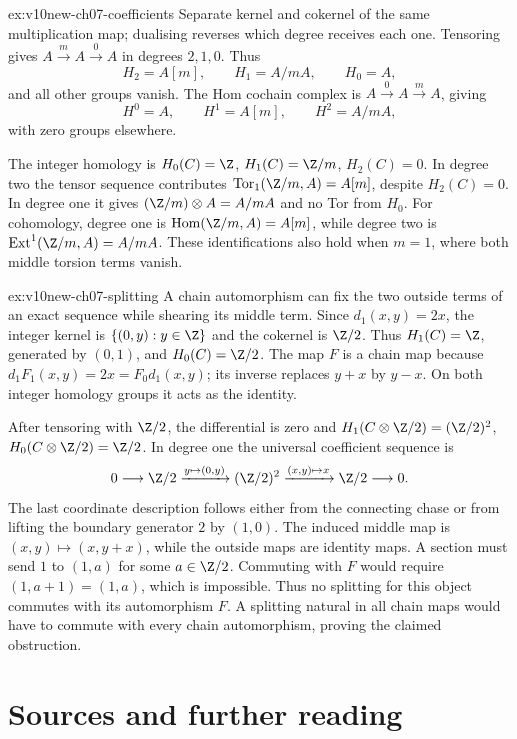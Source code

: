 \begin{solution}{ex:v10new-ch07-coefficients}
\idea Separate kernel and cokernel of the same multiplication map; dualising reverses which degree receives each one.
\writeup Tensoring gives $A\xrightarrow{m}A\xrightarrow0A$ in degrees $2,1,0$. Thus
\[
H_2=A[m],\qquad H_1=A/mA,\qquad H_0=A,
\]
and all other groups vanish. The Hom cochain complex is
$A\xrightarrow0A\xrightarrow{m}A$, giving
\[
H^0=A,\qquad H^1=A[m],\qquad H^2=A/mA,
\]
with zero groups elsewhere.

The integer homology is $H_0(C)=\Z$, $H_1(C)=\Z/m$, $H_2(C)=0$. In degree two the tensor sequence contributes
$\operatorname{Tor}_1(\Z/m,A)=A[m]$, despite $H_2(C)=0$. In degree one it gives $(\Z/m)\otimes A=A/mA$ and no Tor from $H_0$. For cohomology, degree one is
$\operatorname{Hom}(\Z/m,A)=A[m]$, while degree two is
$\operatorname{Ext}^1(\Z/m,A)=A/mA$. These identifications also hold when $m=1$, where both middle torsion terms vanish.
\end{solution}

\begin{solution}{ex:v10new-ch07-splitting}
\idea A chain automorphism can fix the two outside terms of an exact sequence while shearing its middle term.
\writeup Since $d_1(x,y)=2x$, the integer kernel is
$\{(0,y):y\in\Z\}$ and the cokernel is $\Z/2$. Thus
$H_1(C)=\Z$, generated by $(0,1)$, and $H_0(C)=\Z/2$.
The map $F$ is a chain map because $d_1F_1(x,y)=2x=F_0d_1(x,y)$; its inverse replaces $y+x$ by $y-x$. On both integer homology groups it acts as the identity.

After tensoring with $\Z/2$, the differential is zero and
$H_1(C\otimes\Z/2)=(\Z/2)^2$, $H_0(C\otimes\Z/2)=\Z/2$. In degree one the universal coefficient sequence is
\[
0\longrightarrow\Z/2\xrightarrow{y\mapsto(0,y)}
(\Z/2)^2\xrightarrow{(x,y)\mapsto x}\Z/2\longrightarrow0.
\]
The last coordinate description follows either from the connecting chase or from lifting the boundary generator $2$ by $(1,0)$. The induced middle map is
$(x,y)\mapsto(x,y+x)$, while the outside maps are identity maps. A section must send $1$ to $(1,a)$ for some $a\in\Z/2$. Commuting with $F$ would require
$(1,a+1)=(1,a)$, which is impossible. Thus no splitting for this object commutes with its automorphism $F$. A splitting natural in all chain maps would have to commute with every chain automorphism, proving the claimed obstruction.
\end{solution}

\section*{Sources and further reading}

